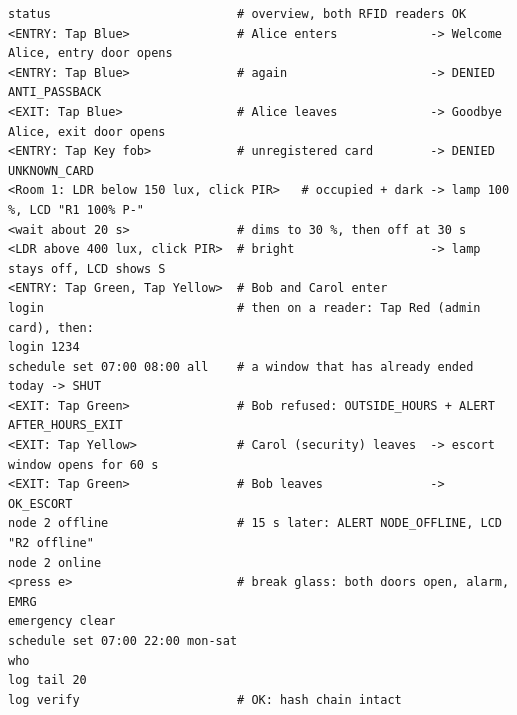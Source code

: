 \begin{lstlisting}[style=console]
status                          # overview, both RFID readers OK
<ENTRY: Tap Blue>               # Alice enters             -> Welcome Alice, entry door opens
<ENTRY: Tap Blue>               # again                    -> DENIED ANTI_PASSBACK
<EXIT: Tap Blue>                # Alice leaves             -> Goodbye Alice, exit door opens
<ENTRY: Tap Key fob>            # unregistered card        -> DENIED UNKNOWN_CARD
<Room 1: LDR below 150 lux, click PIR>   # occupied + dark -> lamp 100 %, LCD "R1 100% P-"
<wait about 20 s>               # dims to 30 %, then off at 30 s
<LDR above 400 lux, click PIR>  # bright                   -> lamp stays off, LCD shows S
<ENTRY: Tap Green, Tap Yellow>  # Bob and Carol enter
login                           # then on a reader: Tap Red (admin card), then:
login 1234
schedule set 07:00 08:00 all    # a window that has already ended today -> SHUT
<EXIT: Tap Green>               # Bob refused: OUTSIDE_HOURS + ALERT AFTER_HOURS_EXIT
<EXIT: Tap Yellow>              # Carol (security) leaves  -> escort window opens for 60 s
<EXIT: Tap Green>               # Bob leaves               -> OK_ESCORT
node 2 offline                  # 15 s later: ALERT NODE_OFFLINE, LCD "R2 offline"
node 2 online
<press e>                       # break glass: both doors open, alarm, EMRG
emergency clear
schedule set 07:00 22:00 mon-sat
who
log tail 20
log verify                      # OK: hash chain intact
\end{lstlisting}
